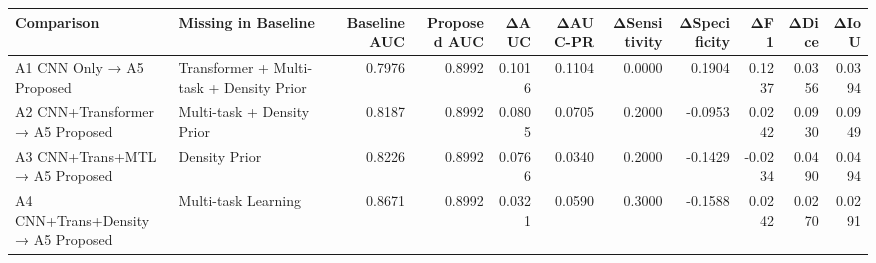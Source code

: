 \begin{tabular}{llrrrrrrrrr}
\toprule
Comparison & Missing in Baseline & Baseline AUC & Proposed AUC & ΔAUC & ΔAUC-PR & ΔSensitivity & ΔSpecificity & ΔF1 & ΔDice & ΔIoU \\
\midrule
A1 CNN Only → A5 Proposed & Transformer + Multi-task + Density Prior & 0.7976 & 0.8992 & 0.1016 & 0.1104 & 0.0000 & 0.1904 & 0.1237 & 0.0356 & 0.0394 \\
A2 CNN+Transformer → A5 Proposed & Multi-task + Density Prior & 0.8187 & 0.8992 & 0.0805 & 0.0705 & 0.2000 & -0.0953 & 0.0242 & 0.0930 & 0.0949 \\
A3 CNN+Trans+MTL → A5 Proposed & Density Prior & 0.8226 & 0.8992 & 0.0766 & 0.0340 & 0.2000 & -0.1429 & -0.0234 & 0.0490 & 0.0494 \\
A4 CNN+Trans+Density → A5 Proposed & Multi-task Learning & 0.8671 & 0.8992 & 0.0321 & 0.0590 & 0.3000 & -0.1588 & 0.0242 & 0.0270 & 0.0291 \\
\bottomrule
\end{tabular}
